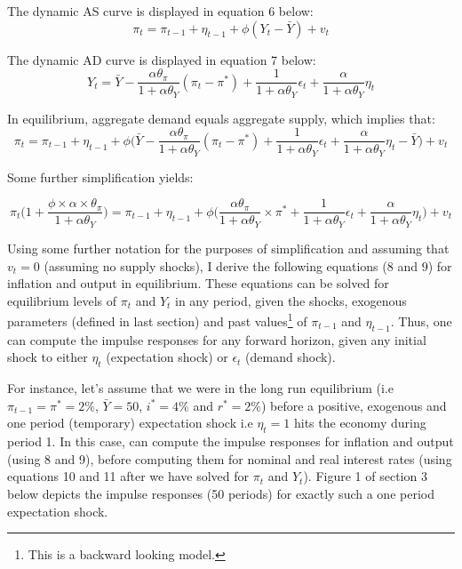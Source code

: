 \documentclass[12pt]{article}
\newcommand{\1}{\mathbbm 1}
\begin{document}
		The dynamic AS curve is displayed in equation 6 below:
			\begin{equation}
			\pi_{t} = \pi_{t-1} + \eta_{t-1} + \phi (Y_{t} - \bar{Y}) + v_{t}
		\end{equation}
	
	The dynamic AD curve is displayed in equation 7 below:
		\begin{equation}
		Y_{t} = \bar{Y} - \frac{\alpha \theta_{\pi}}{1 + \alpha \theta_{Y}}(\pi_{t} - \pi^{*}) + \frac{1}{1 + \alpha \theta_{Y}} \epsilon_{t} + \frac{\alpha}{1 + \alpha \theta_{Y}} \eta_{t}
	\end{equation}

In equilibrium, aggregate demand equals aggregate supply, which implies that:
\begin{equation*}
\pi_{t} = \pi_{t-1} + \eta_{t-1} + \phi\bigg(\bar{Y} - \frac{\alpha \theta_{\pi}}{1 + \alpha \theta_{Y}}(\pi_{t} - \pi^{*}) + \frac{1}{1 + \alpha \theta_{Y}} \epsilon_{t} + \frac{\alpha}{1 + \alpha \theta_{Y}} \eta_{t} - \bar{Y}\bigg) + v_{t}
\end{equation*}

Some further simplification yields:

\begin{equation*}
	\pi_{t}\bigg(1 +  \frac{\phi \times \alpha \times \theta_{\pi}}{1 + \alpha \theta_{Y}}\bigg)  = \pi_{t-1} + \eta_{t-1} + \phi\bigg(\frac{\alpha \theta_{\pi}}{1 + \alpha \theta_{Y}} \times \pi^{*} + \frac{1}{1 + \alpha \theta_{Y}} \epsilon_{t} + \frac{\alpha}{1 + \alpha \theta_{Y}} \eta_{t} \bigg) + v_{t}
\end{equation*}

Using some further notation for the purposes of simplification and assuming that $v_{t} = 0$ (assuming no supply shocks), I derive the following equations ($8$ and $9$) for inflation and output in equilibrium. These equations can be solved for equilibrium levels of $\pi_{t}$ and $Y_{t}$ in any period, given the shocks, exogenous parameters (defined in last section) and past values\footnote{This is a backward looking model.} of $\pi_{t-1}$ and $\eta_{t-1}$. Thus, one can compute the impulse responses for any forward horizon, given any initial shock to either $\eta_{t}$ (expectation shock) or $\epsilon_{t}$ (demand shock). 

For instance, let's assume that we were in the long run equilibrium (i.e $\pi_{t-1} = \pi^{*} = 2\%$, $\bar{Y} = 50$, $i^{*} = 4\%$ and $r^{*} = 2\%$) before a positive, exogenous and one period (temporary) expectation shock i.e $\eta_{t} = 1$ hits the economy during period 1. In this case, can compute the impulse responses for inflation and output (using 8 and 9), before computing them for nominal and real interest rates (using equations 10 and 11 after we have solved for $\pi_{t}$ and $Y_{t}$). Figure 1 of section 3 below depicts the impulse responses (50 periods) for exactly such a one period expectation shock.
\end{document}
